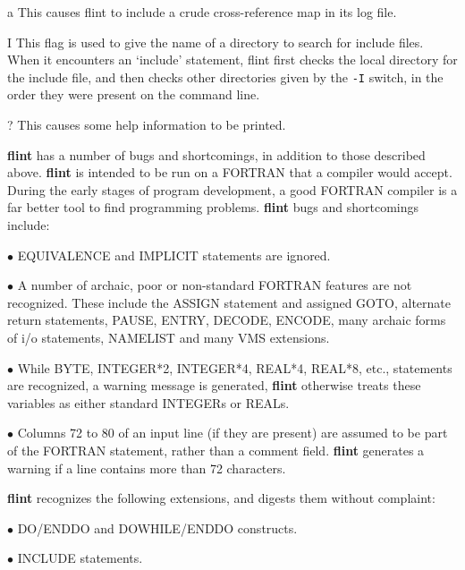
\item{a} This causes flint to include a crude cross-reference map in its
log file.
\item{I} This flag is used to give the name of a directory to search for
include files. When it encounters an `include' statement, flint first checks
the local directory for the include file, and then checks other
directories given by the {\tt -I} switch, in the order they were present
on the command line.
\item{?} This causes some help information to be printed.


{\bf flint} has a number of bugs and
shortcomings, in addition to those described above. {\bf flint} is intended
to be run on a FORTRAN that a compiler would accept.  During the early
stages of program development, a good FORTRAN compiler is a far better
tool to find programming problems. {\bf flint} bugs and shortcomings include:

\item{$\bullet$} EQUIVALENCE and IMPLICIT statements are ignored.

\item{$\bullet$} A number of archaic, poor or non-standard FORTRAN features
are not recognized. These include the ASSIGN statement and assigned GOTO,
alternate return statements, PAUSE, ENTRY, DECODE, ENCODE, many
archaic forms of i/o statements, NAMELIST and many VMS extensions.

\item{$\bullet$} While BYTE, INTEGER*2, INTEGER*4, REAL*4, REAL*8, etc.,
 statements are recognized, a warning message is generated, {\bf flint}
otherwise treats these variables as either standard INTEGERs or REALs.

\item{$\bullet$} Columns 72 to 80 of an input line (if they are present)
are assumed to be part of the FORTRAN statement, rather than a comment
field. {\bf flint} generates a warning if a line contains more than 72
characters.

{\bf flint} recognizes the following extensions, and digests them without
complaint:
\smallskip
\item{$\bullet$} DO/ENDDO and DOWHILE/ENDDO constructs.

\item{$\bullet$} INCLUDE statements.

